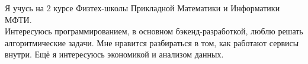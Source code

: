 Я учусь на 2 курсе Физтех-школы Прикладной Математики и Информатики МФТИ.\\ Интересуюсь программированием, в основном бэкенд-разработкой, люблю решать алгоритмические задачи.
Мне нравится разбираться в том, как работают сервисы внутри. Ещё я интересуюсь экономикой и анализом данных.